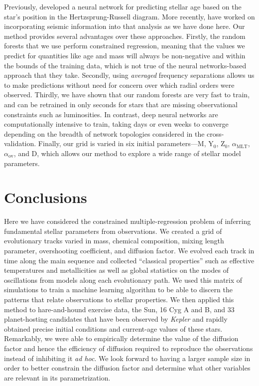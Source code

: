 \documentclass[twocolumn,twocolappendix]{aastex6}
\begin{document}
Previously, \citet{pulone1997age} developed a neural network for predicting stellar age based on the star's position in the Hertzsprung-Russell diagram. More recently, \citet{2016arXiv160200902V} have worked on incorporating seismic information into that analysis as we have done here. Our method provides several advantages over these approaches. Firstly, the random forests that we use perform constrained regression, meaning that the values we predict for quantities like age and mass will always be non-negative and within the bounds of the training data, which is not true of the neural networks-based approach that they take. Secondly, using \emph{averaged} frequency separations allows us to make predictions without need for concern over which radial orders were observed. Thirdly, we have shown that our random forests are very fast to train, and can be retrained in only seconds for stars that are missing observational constraints such as luminosities. In contrast, deep neural networks are computationally intensive to train, taking days or even weeks to converge depending on the breadth of network topologies considered in the cross-validation. Finally, our grid is varied in six initial parameters---M, Y$_0$, Z$_0$, $\alpha_{\text{MLT}}$, $\alpha_{\text{ov}}$, and D, which allows our method to explore a wide range of stellar model parameters.


\section{Conclusions}
Here we have considered the constrained multiple-regression problem of inferring fundamental stellar parameters from observations. We created a grid of evolutionary tracks varied in mass, chemical composition, mixing length parameter, overshooting coefficient, and diffusion factor. We evolved each track in time along the main sequence and collected ``classical properties'' such as effective temperatures and metallicities as well as global statistics on the modes of oscillations from models along each evolutionary path. We used this matrix of simulations to train a machine learning algorithm to be able to discern the patterns that relate observations to stellar properties. We then applied this method to hare-and-hound exercise data, the Sun, 16 Cyg A and B, and 33 planet-hosting candidates that have been observed by \emph{Kepler} and rapidly obtained precise initial conditions and current-age values of these stars.%
Remarkably, we were able to empirically determine the value of the diffusion factor and hence the efficiency of diffusion required to reproduce the observations instead of inhibiting it \emph{ad hoc}. We look forward to having a larger sample size in order to better constrain the diffusion factor and determine what other variables are relevant in its parametrization. 
\end{document}
